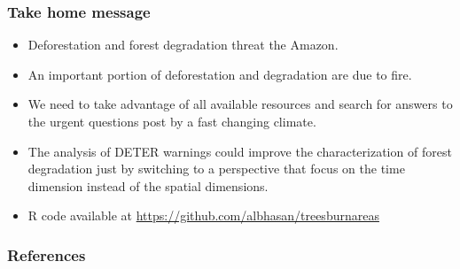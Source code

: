 \documentclass[aspectratio=169]{beamer}
\begin{document}




\begin{frame}
  \frametitle{Take home message}
  \begin{itemize}
    \item Deforestation and forest degradation threat the Amazon.
    \item An important portion of deforestation and degradation are due to 
      fire.
    \item We need to take advantage of all available resources and search for 
      answers to the urgent questions post by a fast changing climate.
     \item The analysis of DETER warnings could improve the characterization 
       of forest degradation just by switching to a perspective that focus 
       on the time dimension instead of the spatial dimensions.
     \item R code available at 
         \url{https://github.com/albhasan/treesburnareas}
  \end{itemize}
\end{frame}

\begin{frame}[allowframebreaks]
  \frametitle{References}
  
  
\end{frame}
\end{document}
